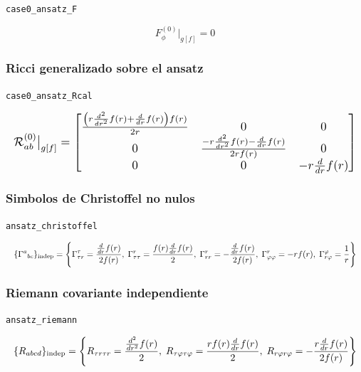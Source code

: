 \documentclass[11pt,a4paper]{article}
\begin{document}
\noindent\texttt{case0\_ansatz\_F}\par\nopagebreak[4]

\[
F_\phi^{(0)}\big|_{g[f]} = 0
\]

\subsubsection{Ricci generalizado sobre el ansatz}

\noindent\texttt{case0\_ansatz\_Rcal}\par\nopagebreak[4]

\[
\resizebox{\textwidth}{!}{$\displaystyle \mathcal R^{(0)}_{ab}\big|_{g[f]} = \left[\begin{matrix}\frac{\left(r \frac{d^{2}}{d r^{2}} f{\left(r \right)} + \frac{d}{d r} f{\left(r \right)}\right) f{\left(r \right)}}{2 r} & 0 & 0\\0 & \frac{- r \frac{d^{2}}{d r^{2}} f{\left(r \right)} - \frac{d}{d r} f{\left(r \right)}}{2 r f{\left(r \right)}} & 0\\0 & 0 & - r \frac{d}{d r} f{\left(r \right)}\end{matrix}\right]$}
\]

\subsubsection{Simbolos de Christoffel no nulos}

\noindent\texttt{ansatz\_christoffel}\par\nopagebreak[4]

\[
\resizebox{\textwidth}{!}{$\displaystyle \{\Gamma^a{}_{bc}\}_{\mathrm{indep}} = \left\{\Gamma^{\tau}_{{\tau}{r}}=\frac{\frac{d}{d r} f{\left(r \right)}}{2 f{\left(r \right)}},\;\Gamma^{r}_{{\tau}{\tau}}=\frac{f{\left(r \right)} \frac{d}{d r} f{\left(r \right)}}{2},\;\Gamma^{r}_{{r}{r}}=- \frac{\frac{d}{d r} f{\left(r \right)}}{2 f{\left(r \right)}},\;\Gamma^{r}_{{\varphi}{\varphi}}=- r f{\left(r \right)},\;\Gamma^{\varphi}_{{r}{\varphi}}=\frac{1}{r}\right\}$}
\]

\subsubsection{Riemann covariante independiente}

\noindent\texttt{ansatz\_riemann}\par\nopagebreak[4]

\[
\resizebox{\textwidth}{!}{$\displaystyle \{R_{abcd}\}_{\mathrm{indep}} = \left\{R_{{\tau}{r}{\tau}{r}}=\frac{\frac{d^{2}}{d r^{2}} f{\left(r \right)}}{2},\;R_{{\tau}{\varphi}{\tau}{\varphi}}=\frac{r f{\left(r \right)} \frac{d}{d r} f{\left(r \right)}}{2},\;R_{{r}{\varphi}{r}{\varphi}}=- \frac{r \frac{d}{d r} f{\left(r \right)}}{2 f{\left(r \right)}}\right\}$}
\]
\end{document}
